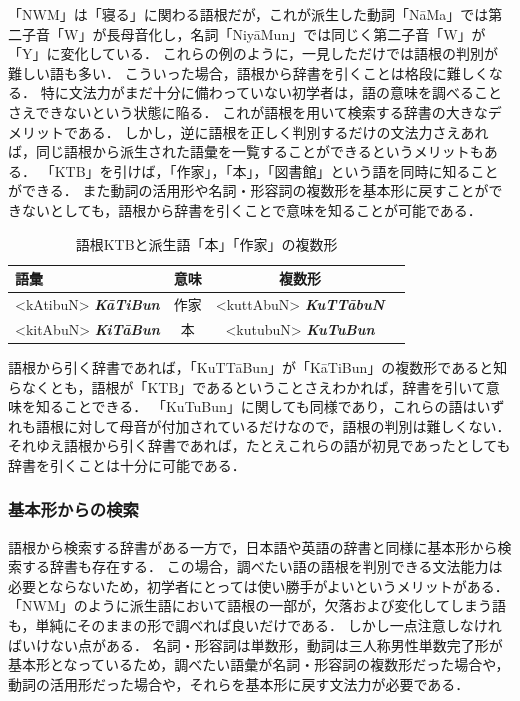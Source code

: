 \documentclass[technicalreport]{ieicej}
\begin{document}
「NWM」は「寝る」に関わる語根だが，これが派生した動詞「N\=aMa」では第二子音「W」が長母音化し，名詞「Niy\=aMun」では同じく第二子音「W」が「Y」に変化している．
これらの例のように，一見しただけでは語根の判別が難しい語も多い．
こういった場合，語根から辞書を引くことは格段に難しくなる．
特に文法力がまだ十分に備わっていない初学者は，語の意味を調べることさえできないという状態に陥る．
これが語根を用いて検索する辞書の大きなデメリットである．
しかし，逆に語根を正しく判別するだけの文法力さえあれば，同じ語根から派生された語彙を一覧することができるというメリットもある．
「KTB」を引けば，「作家」，「本」，「図書館」という語を同時に知ることができる．
また動詞の活用形や名詞・形容詞の複数形を基本形に戻すことができないとしても，語根から辞書を引くことで意味を知ることが可能である．

\begin{table}[ht]
\begin{center}
\begin{tabular}{l|ccc}
   語彙 & 意味 & 複数形\\
  \hline
  <kAtibuN> \textit{\textbf{K\=aTiBun}} & 作家 & <kuttAbuN> \textit{\textbf{KuTT\=abuN}}\\
  <kitAbuN> \textit{\textbf{KiT\=aBun}} & 本 & <kutubuN> \textit{\textbf{KuTuBun}}\\
\hline
\end{tabular}
\caption{語根KTBと派生語「本」「作家」の複数形}
\label{table:alignment}
\end{center}
\end{table}

語根から引く辞書であれば，「KuTTāBun」が「KāTiBun」の複数形であると知らなくとも，語根が「KTB」であるということさえわかれば，辞書を引いて意味を知ることできる．
「KuTuBun」に関しても同様であり，これらの語はいずれも語根に対して母音が付加されているだけなので，語根の判別は難しくない．
それゆえ語根から引く辞書であれば，たとえこれらの語が初見であったとしても辞書を引くことは十分に可能である．

\subsubsection{基本形からの検索}
語根から検索する辞書がある一方で，日本語や英語の辞書と同様に基本形から検索する辞書も存在する．
この場合，調べたい語の語根を判別できる文法能力は必要とならないため，初学者にとっては使い勝手がよいというメリットがある．
「NWM」のように派生語において語根の一部が，欠落および変化してしまう語も，単純にそのままの形で調べれば良いだけである．
しかし一点注意しなければいけない点がある．
名詞・形容詞は単数形，動詞は三人称男性単数完了形が基本形となっているため，調べたい語彙が名詞・形容詞の複数形だった場合や，動詞の活用形だった場合や，それらを基本形に戻す文法力が必要である．
\end{document}
